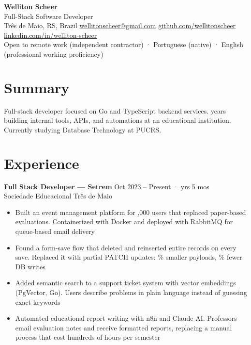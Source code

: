 \documentclass[a4paper,11pt]{article}
\begin{document}
\begin{center}
  {\LARGE\bfseries Welliton Scheer} \\[4pt]
  {\color{muted} Full-Stack Software Developer} \\[4pt]
  {\small
    Três de Maio, RS, Brazil \quad
    \href{mailto:wellitonscheer@gmail.com}{wellitonscheer@gmail.com} \quad
    \href{https://github.com/wellitonscheer}{github.com/wellitonscheer} \quad
    \href{https://linkedin.com/in/welliton-scheer}{linkedin.com/in/welliton-scheer}
  } \\[2pt]
  {\small\color{muted} Open to remote work (independent contractor) · Portuguese (native) · English (professional working proficiency)}
\end{center}

\section{Summary}

Full-stack developer focused on Go and TypeScript backend services.  years building
internal tools, APIs, and automations at an educational institution.
Currently studying Database Technology at PUCRS.

\section{Experience}

\textbf{Full Stack Developer --- Setrem} \hfill {\small Oct 2023 -- Present ·  yrs 5 mos} \\
{\small\color{muted} Sociedade Educacional Três de Maio}
\begin{itemize}
  \item Built an event management platform for ,000 users that replaced paper-based evaluations. Containerized with Docker and deployed with RabbitMQ for queue-based email delivery
  \item Found a form-save flow that deleted and reinserted entire records on every save. Replaced it with partial PATCH updates: \% smaller payloads, \% fewer DB writes
  \item Added semantic search to a support ticket system with vector embeddings (PgVector, Go). Users describe problems in plain language instead of guessing exact keywords
  \item Automated educational report writing with n8n and Claude AI. Professors email evaluation notes and receive formatted reports, replacing a manual process that cost hundreds of hours per semester
\end{itemize}
\end{document}

